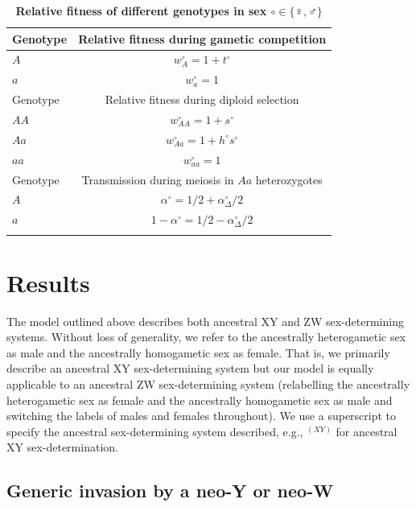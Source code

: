 \documentclass[10pt,letterpaper]{article}
\begin{document}
\begin{table}[ht]
\smallskip
\caption{{\bf Relative fitness of different genotypes in sex $\circ \in \{\female,\male\}$ } }
\begin{tabular}{l c }
\hline\hline
  Genotype & Relative fitness during gametic competition \\ [0.5ex] \hline
  $A$ & $w_{A}^\circ = 1+t^\circ$ \\
  $a$ & $w_{a}^\circ = 1$ \\ [0.5ex] \hline
  Genotype & Relative fitness during diploid selection \\ [0.5ex] \hline
  $AA$ & $w_{AA}^\circ = 1+ s^\circ$ \\
  $Aa$ & $w_{Aa}^\circ = 1+h^\circ s^\circ$ \\
  $aa$ & $w_{aa}^\circ = 1$ \\ [0.5ex] \hline
  Genotype & Transmission during meiosis in $Aa$ heterozygotes \\ [0.5ex] \hline
  $A$ & $\alpha^\circ=1/2+\alpha_{\Delta}^{\circ}/2$ \\
  $a$ & $1-\alpha^\circ=1/2-\alpha_{\Delta}^{\circ}/2$ \\
  \hline \hline
  \label{tab:fitnesstable}
 \end{tabular}
\end{table}

\section*{Results}

The model outlined above describes both ancestral XY and ZW sex-determining systems. %
Without loss of generality, we refer to the ancestrally heterogametic sex as male and the ancestrally homogametic sex as female.
That is, we primarily describe an ancestral XY sex-determining system but our model is equally applicable to an ancestral ZW sex-determining system (relabelling the ancestrally heterogametic sex as female and the ancestrally homogametic sex as male and switching the labels of males and females throughout). 
We use a superscript to specify the ancestral sex-determining system described, e.g., $^{(XY)}$ for ancestral XY sex-determination.

\subsection*{Generic invasion by a neo-Y or neo-W}
\end{document}
